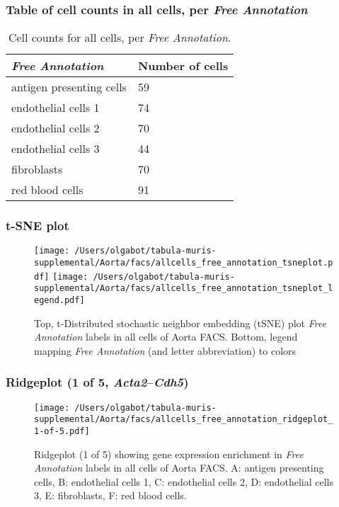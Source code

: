 \subsubsection{Table of cell counts in all cells, per \emph{Free Annotation}}\begin{table}[h]
\centering
\label{my-label}
\begin{tabular}{@{}ll@{}}
\toprule

\emph{Free Annotation}& Number of cells \\ \midrule
antigen presenting cells & 59 \\

endothelial cells 1 & 74 \\

endothelial cells 2 & 70 \\

endothelial cells 3 & 44 \\

fibroblasts & 70 \\

red blood cells & 91 \\
\bottomrule
\end{tabular}
\caption{Cell counts for all cells, per \emph{Free Annotation}.}
\end{table}

\clearpage
\subsubsection{t-SNE plot}
\begin{figure}[h]
\centering
\texttt{[image: /Users/olgabot/tabula-muris-supplemental/Aorta/facs/allcells\_free\_annotation\_tsneplot.pdf]}
\texttt{[image: /Users/olgabot/tabula-muris-supplemental/Aorta/facs/allcells\_free\_annotation\_tsneplot\_legend.pdf]}
\caption{Top, t-Distributed stochastic neighbor embedding (tSNE) plot  \emph{Free Annotation} labels in all cells of Aorta FACS. Bottom, legend mapping \emph{Free Annotation} (and letter abbreviation) to colors}
\end{figure}


\clearpage

\subsubsection{Ridgeplot (1 of 5, \emph{Acta2}--\emph{Cdh5})}
\begin{figure}[h]
\centering
\texttt{[image: /Users/olgabot/tabula-muris-supplemental/Aorta/facs/allcells\_free\_annotation\_ridgeplot\_1-of-5.pdf]}

\caption{ Ridgeplot (1 of 5)  showing gene expression enrichment in \emph{Free Annotation} labels in all cells of Aorta FACS. A: antigen presenting cells, B: endothelial cells 1, C: endothelial cells 2, D: endothelial cells 3, E: fibroblasts, F: red blood cells.}
\end{figure}


